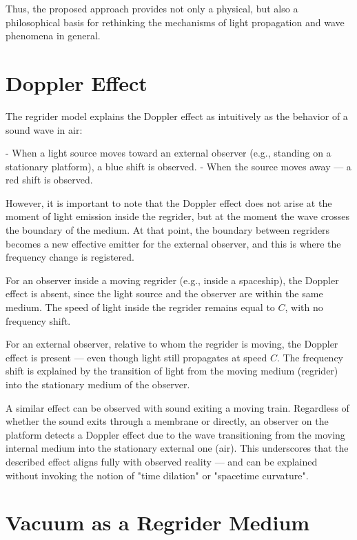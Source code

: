 \documentclass[12pt]{article}
\begin{document}
Thus, the proposed approach provides not only a physical, but also a philosophical basis for rethinking the mechanisms of light propagation and wave phenomena in general.


\section*{Doppler Effect}

The regrider model explains the Doppler effect as intuitively as the behavior of a sound wave in air:

- When a light source moves toward an external observer (e.g., standing on a stationary platform), a blue shift is observed.
- When the source moves away — a red shift is observed.

However, it is important to note that the Doppler effect does not arise at the moment of light emission inside the regrider, but at the moment the wave crosses the boundary of the medium. At that point, the boundary between regriders becomes a new effective emitter for the external observer, and this is where the frequency change is registered.

For an observer inside a moving regrider (e.g., inside a spaceship), the Doppler effect is absent, since the light source and the observer are within the same medium. The speed of light inside the regrider remains equal to $C$, with no frequency shift.

For an external observer, relative to whom the regrider is moving, the Doppler effect is present — even though light still propagates at speed $C$. The frequency shift is explained by the transition of light from the moving medium (regrider) into the stationary medium of the observer.

A similar effect can be observed with sound exiting a moving train. Regardless of whether the sound exits through a membrane or directly, an observer on the platform detects a Doppler effect due to the wave transitioning from the moving internal medium into the stationary external one (air). This underscores that the described effect aligns fully with observed reality — and can be explained without invoking the notion of "time dilation" or "spacetime curvature".

\section*{Vacuum as a Regrider Medium}
\end{document}
